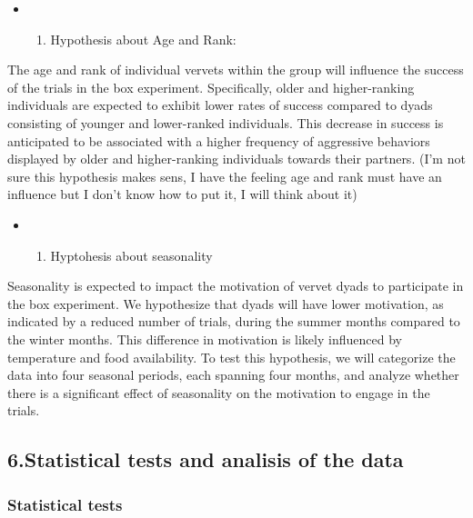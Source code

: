 \documentclass[
]{article}
\providecommand{\tightlist}{%
  \setlength{\itemsep}{0pt}\setlength{\parskip}{0pt}}
\begin{document}
\begin{itemize}
\item
  \begin{enumerate}
  \def\labelenumi{\arabic{enumi}.}
  \setcounter{enumi}{3}
  \tightlist
  \item
    Hypothesis about Age and Rank:
  \end{enumerate}
\end{itemize}

The age and rank of individual vervets within the group will influence
the success of the trials in the box experiment. Specifically, older and
higher-ranking individuals are expected to exhibit lower rates of
success compared to dyads consisting of younger and lower-ranked
individuals. This decrease in success is anticipated to be associated
with a higher frequency of aggressive behaviors displayed by older and
higher-ranking individuals towards their partners. (I'm not sure this
hypothesis makes sens, I have the feeling age and rank must have an
influence but I don't know how to put it, I will think about it)

\begin{itemize}
\item
  \begin{enumerate}
  \def\labelenumi{\arabic{enumi}.}
  \setcounter{enumi}{4}
  \tightlist
  \item
    Hyptohesis about seasonality
  \end{enumerate}
\end{itemize}

Seasonality is expected to impact the motivation of vervet dyads to
participate in the box experiment. We hypothesize that dyads will have
lower motivation, as indicated by a reduced number of trials, during the
summer months compared to the winter months. This difference in
motivation is likely influenced by temperature and food availability. To
test this hypothesis, we will categorize the data into four seasonal
periods, each spanning four months, and analyze whether there is a
significant effect of seasonality on the motivation to engage in the
trials.

\hypertarget{statistical-tests-and-analisis-of-the-data}{%
\subsection{6.Statistical tests and analisis of the
data}\label{statistical-tests-and-analisis-of-the-data}}

\hypertarget{statistical-tests}{%
\subsubsection{Statistical tests}\label{statistical-tests}}
\end{document}
